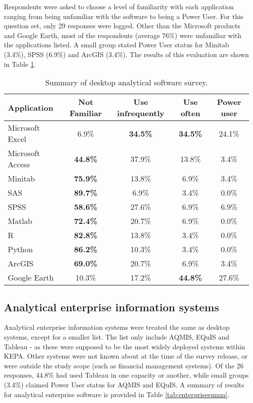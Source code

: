 Respondents were asked to choose a level of familiarity with each application ranging from being unfamiliar with the software to being a Power User. For this question set, only 29 responses were logged. Other than the Microsoft products and Google Earth, most of the respondents (average 76\%) were unfamiliar with the applications listed. A small group stated Power User status for Minitab (3.4\%), SPSS (6.9\%) and ArcGIS (3.4\%).  The results of this evaluation are shown in Table \ref{tb:desktopsummary}.

\begin{table}[!htpb]
\centering
\caption{Summary of desktop analytical software survey.}
\label{tb:desktopsummary}
\begin{tabular}{@{}lcccc@{}}
\toprule
\textbf{Application} & \textbf{Not Familiar} & \textbf{Use infrequently} & \textbf{Use often} & \textbf{Power user} \\ \midrule
Microsoft Excel & 6.9\% & \textbf{34.5\%} & \textbf{34.5\%} & 24.1\% \\
Microsoft Access & \textbf{44.8\%} & 37.9\% & 13.8\% & 3.4\% \\
Minitab & \textbf{75.9\%} & 13.8\% & 6.9\% & 3.4\% \\
SAS & \textbf{89.7\%} & 6.9\% & 3.4\% & 0.0\% \\
SPSS & \textbf{58.6\%} & 27.6\% & 6.9\% & 6.9\% \\
Matlab & \textbf{72.4\%} & 20.7\% & 6.9\% & 0.0\% \\
R & \textbf{82.8\%} & 13.8\% & 3.4\% & 0.0\% \\
Python & \textbf{86.2\%} & 10.3\% & 3.4\% & 0.0\% \\
ArcGIS & \textbf{69.0\%} & 20.7\% & 6.9\% & 3.4\% \\
Google Earth & 10.3\% & 17.2\% & \textbf{44.8\%} & 27.6\% \\ \bottomrule
\end{tabular}
\end{table}

\subsection{Analytical enterprise information systems}

Analytical enterprise information systems were treated the same as desktop systems, except for a smaller list. The list only include AQMIS, EQuIS and Tableau - as these were supposed to be the most widely deployed systems within KEPA. Other systems were not known about at the time of the survey release, or were outside the study scope (such as financial management systems). Of the 26 responses, 44.8\% had used Tableau in one capacity or another, while small groups (3.4\%) claimed Power User status for AQMIS and EQuIS. A summary of results for analytical enterprise software is provided in Table \ref{tab:enterprisesumm}.

